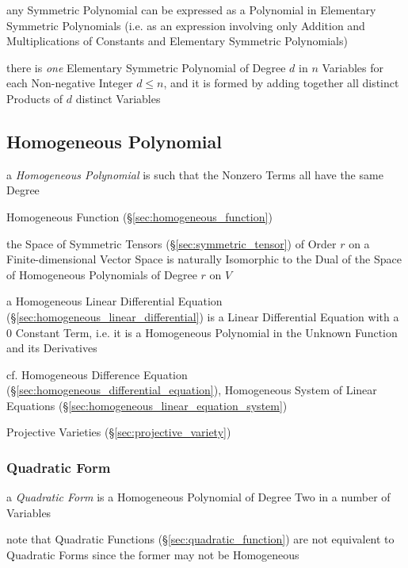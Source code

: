 any Symmetric Polynomial can be expressed as a Polynomial in Elementary
Symmetric Polynomials (i.e. as an expression involving only Addition and
Multiplications of Constants and Elementary Symmetric Polynomials)

there is \emph{one} Elementary Symmetric Polynomial of Degree $d$ in $n$
Variables for each Non-negative Integer $d \leq n$, and it is formed by adding
together all distinct Products of $d$ distinct Variables



\subsection{Homogeneous Polynomial}\label{sec:homogeneous_polynomial}

a \emph{Homogeneous Polynomial} is such that the Nonzero Terms all have the same
Degree

Homogeneous Function (\S\ref{sec:homogeneous_function})

the Space of Symmetric Tensors (\S\ref{sec:symmetric_tensor}) of Order $r$ on a
Finite-dimensional Vector Space is naturally Isomorphic to the Dual of the
Space of Homogeneous Polynomials of Degree $r$ on $V$

a Homogeneous Linear Differential Equation
(\S\ref{sec:homogeneous_linear_differential}) is a Linear Differential
Equation with a $0$ Constant Term, i.e. it is a Homogeneous Polynomial in the
Unknown Function and its Derivatives

cf. Homogeneous Difference Equation
(\S\ref{sec:homogeneous_differential_equation}),
Homogeneous System of Linear Equations
(\S\ref{sec:homogeneous_linear_equation_system})

Projective Varieties (\S\ref{sec:projective_variety})



\subsubsection{Quadratic Form}\label{sec:quadratic_form}

a \emph{Quadratic Form} is a Homogeneous Polynomial of Degree Two in a number of
Variables

note that Quadratic Functions (\S\ref{sec:quadratic_function}) are not
equivalent to Quadratic Forms since the former may not be Homogeneous

